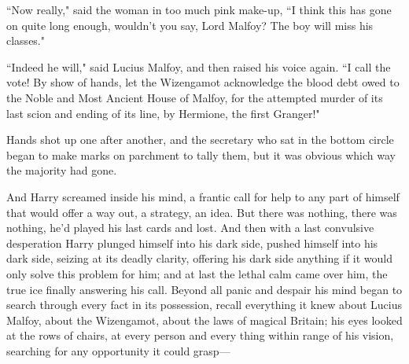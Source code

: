 ``Now really," said the woman in too much pink make-up, ``I think this has gone on quite long enough, wouldn't you say, Lord Malfoy? The boy will miss his classes."

``Indeed he will," said Lucius Malfoy, and then raised his voice again. ``I call the vote! By show of hands, let the Wizengamot acknowledge the blood debt owed to the Noble and Most Ancient House of Malfoy, for the attempted murder of its last scion and ending of its line, by Hermione, the first Granger!"

Hands shot up one after another, and the secretary who sat in the bottom circle began to make marks on parchment to tally them, but it was obvious which way the majority had gone.

And Harry screamed inside his mind, a frantic call for help to any part of himself that would offer a way out, a strategy, an idea. But there was nothing, there was nothing, he'd played his last cards and lost. And then with a last convulsive desperation Harry plunged himself into his dark side, pushed himself into his dark side, seizing at its deadly clarity, offering his dark side anything if it would only solve this problem for him; and at last the lethal calm came over him, the true ice finally answering his call. Beyond all panic and despair his mind began to search through every fact in its possession, recall everything it knew about Lucius Malfoy, about the Wizengamot, about the laws of magical Britain; his eyes looked at the rows of chairs, at every person and every thing within range of his vision, searching for any opportunity it could grasp—

